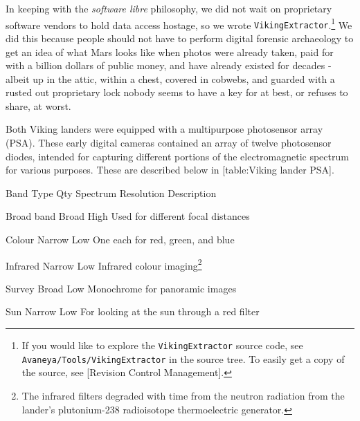 
In keeping with the {\it software libre} philosophy, we did not wait on proprietary software vendors to hold data access hostage, so we wrote {\tt VikingExtractor}.\footnote{If you would like to explore the {\tt VikingExtractor} source code, see {\tt Avaneya/Tools/VikingExtractor} in the source tree. To easily get a copy of the source, see [Revision Control Management].} We did this because people should not have to perform digital forensic archaeology to get an idea of what Mars looks like when photos were already taken, paid for with a billion dollars of public money, and have already existed for decades - albeit up in the attic, within a chest, covered in cobwebs, and guarded with a rusted out proprietary lock nobody seems to have a key for at best, or refuses to share, at worst.

    {}

Both Viking landers were equipped with a multipurpose photosensor array (PSA). These early digital cameras contained an array of twelve photosensor diodes, intended for capturing different portions of the electromagnetic spectrum for various purposes. These are described below in [table:Viking lander PSA].

{
    \bTABLE[split=repeat,option=stretch]
    \setupTABLE[column][5]
        [width=.43\textwidth,
        align=yes]
    \setupTABLE[row][each][align=center]
    \setupTABLE[4][1][align=center]

\bTABLEhead
    \bTR[bottomframe=on]
      \bTH  Band Type \eTH
      \bTH  Qty \eTH
      \bTH  Spectrum \eTH
      \bTH  Resolution \eTH
      \bTH  Description \eTH
    \eTR
\eTABLEhead

\bTABLEbody
    \bTR
      \bTC Broad band \eTC
       \eTC
      \bTC Broad \eTC
      \bTC High \eTC
      \bTC Used for different focal distances \eTC
    \eTR

    \bTR
      \bTC Colour \eTC
       \eTC
      \bTC Narrow \eTC
      \bTC Low \eTC
      \bTC One each for red, green, and blue \eTC
    \eTR

    \bTR
      \bTC Infrared \eTC
       \eTC
      \bTC Narrow \eTC
      \bTC Low \eTC
      \bTC Infrared colour imaging\footnote{The infrared filters degraded with time from the neutron radiation from the lander's plutonium-238 radioisotope thermoelectric generator.} \eTC
    \eTR

    \bTR
      \bTC Survey \eTC
       \eTC
      \bTC Broad \eTC
      \bTC Low \eTC
      \bTC Monochrome for panoramic images \eTC
    \eTR
    
    \bTR
      \bTC Sun \eTC
       \eTC
      \bTC Narrow \eTC
      \bTC Low \eTC
      \bTC For looking at the sun through a red filter \eTC
    \eTR

\eTABLEbody

\eTABLE
}

